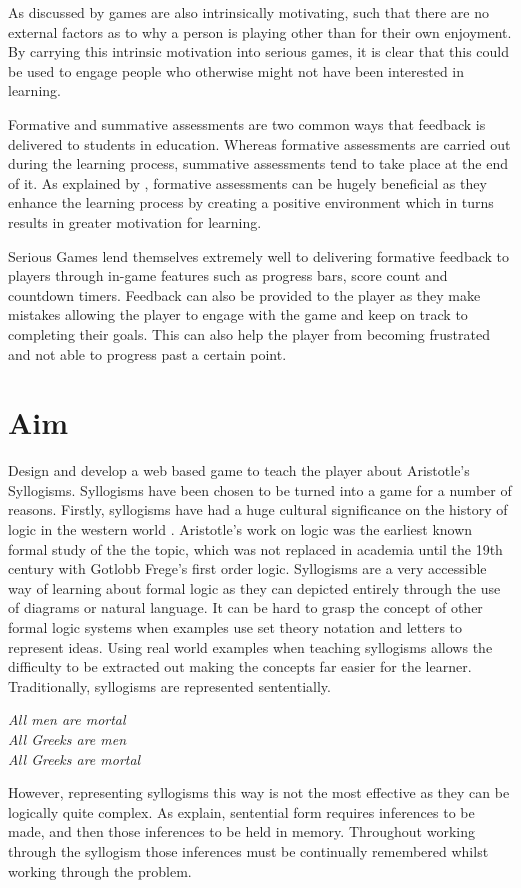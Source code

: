 \documentclass[12pt,a4paper]{report}
\newenvironment{tightcenter}{%
  \setlength\topsep{0pt}
  \setlength\parskip{0pt}
  \begin{center}
}{%
  \end{center}
}
\begin{document}
As discussed by \cite{malone1981toward} games are also intrinsically motivating, such that there are no external factors as to why a person is playing other than for their own enjoyment. By carrying this intrinsic motivation into serious games, it is clear that this could be used to engage people who otherwise might not have been interested in learning. 

Formative and summative assessments are two common ways that feedback is delivered to students in education. Whereas formative assessments are carried out during the learning process, summative assessments tend to take place at the end of it. As explained by \cite{irons2007enhancing}, formative assessments can be hugely beneficial as they enhance the learning process by creating a positive environment which in turns results in greater motivation for learning. 

Serious Games lend themselves extremely well to delivering formative feedback to players through in-game features such as progress bars, score count and countdown timers. Feedback can also be provided to the player as they make mistakes allowing the player to engage with the game and keep on track to completing their goals. This can also help the player from becoming frustrated and not able to progress past a certain point.


\section{Aim}
Design and develop a web based game to teach the player about Aristotle's Syllogisms.
Syllogisms have been chosen to be turned into a game for a number of reasons. Firstly, syllogisms have had a huge cultural significance on the history of logic in the western world \citep{sep-aristotle-logic}. Aristotle's work on logic was the earliest known formal study of the the topic, which was not replaced in academia until the 19th century with Gotlobb Frege's first order logic.
Syllogisms are a very accessible way of learning about formal logic as they can depicted entirely through the use of diagrams or natural language. It can be hard to grasp the concept of other formal logic systems when examples use set theory notation and letters to represent ideas.
Using real world examples when teaching syllogisms allows the difficulty to be extracted out making the concepts far easier for the learner. Traditionally, syllogisms are represented sententially.
\bigbreak
\begin{tightcenter}
\textit{All men are mortal}\\
\textit{All Greeks are men}\\
\textit{All Greeks are mortal}\\
\end{tightcenter}
\bigbreak
However, representing syllogisms this way is not the most effective as they can be logically quite complex. As \cite{larkin1987diagram} explain, sentential form requires inferences to be made, and then those inferences to be held in memory. Throughout working through the syllogism those inferences must be continually remembered whilst working through the problem.
\end{document}

